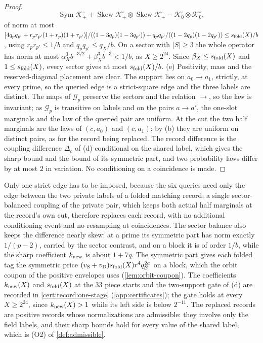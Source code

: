 \begin{proof}
\[ \operatorname{Sym}\mathcal K_+^\circ+\operatorname{Skew}\mathcal K_+^\circ\otimes
 \operatorname{Skew}\mathcal K_+^\circ-\mathcal K_0^\circ\otimes\mathcal K_0^\circ ,
\]
of norm at most
$[4q_pq_{p'}+r_pr_{p'}(1+r_p)(1+r_{p'})]/((1-3q_p)(1-3q_{p'}))
+q_pq_{p'}/((1-2q_p)(1-2q_{p'}))\le s_{\rm fold}(X)/b$, using
$r_pr_{p'}\le1/b$ and $q_pq_{p'}\le q_X/b$. On a sector with $|S|\ge3$ the
whole operator has norm at most $\alpha_X^3b^{-3/2}+\beta_X^3b^{-3}<1/b$, as
$X\ge2^{24}$. Since $\beta_X\le s_{\rm fold}(X)$ and $1\le s_{\rm fold}(X)$,
every sector gives at most $s_{\rm fold}(X)/b$.
(e) Positivity, mass and the reserved-diagonal placement are clear. The
support lies on $a_0\to a_1$, strictly, at every prime, so the queried
edge is a strict-square edge and the three labels are distinct. The maps
of $\mathcal G_p$ preserve the sectors and the relation $\to$, so the law
is invariant; as $\mathcal G_p$ is transitive on labels and on the pairs
$a\to a'$, the one-slot marginals and the law of the queried pair are
uniform. At the cut the two half marginals are the laws of
$(c,a_0)$ and $(c,a_1)$; by (b) they are uniform on distinct pairs, as for
the record being replaced. The record difference is the coupling
difference $\Delta_c$ of (d) conditional on the shared label, which gives the
sharp bound and the bound of its symmetric part, and two probability laws
differ by at most $2$ in variation. No conditioning on a coincidence is
made.
\end{proof}

Only one strict edge has to be imposed, because the six queries need only
the edge between the two private labels of a folded matching record; a
single sector-balanced coupling of the private pair, which keeps both
actual half marginals at the record's own cut, therefore replaces each
record, with no additional conditioning event and no resampling at coincidences. The sector balance also
keeps the difference nearly skew: at a prime its symmetric part has norm exactly
$1/(p-2)$, carried by the sector contrast, and on a block it is of order
$1/b$, while the sharp coefficient $k_{\rm new}$ is about $1+7q$. The
symmetric part gives each folded tag the symmetric price
$(v_{\rm S}+v_{\rm D})s_{\rm fold}(X)r^4q_{\mathcal B}^{2a}$ on a block, which the
orbit coupon of the positive envelopes uses (\cref{lem:orbit-coupon}). The
coefficients
$k_{\rm new}(X)$ and $s_{\rm fold}(X)$ at the $33$ piece starts and the
two-support gate of (d) are recorded in \cref{cert:record:one-stage}
(\cref{app:certificates}); the gate holds at every $X\ge2^{24}$, since
$k_{\rm new}(X)>1$ while its left side is below $2^{-11}$. The replaced records
are positive records whose normalizations are admissible: they involve only
the field labels, and their sharp bounds hold for every value of the shared
label, which is (O2) of \cref{def:admissible}.

